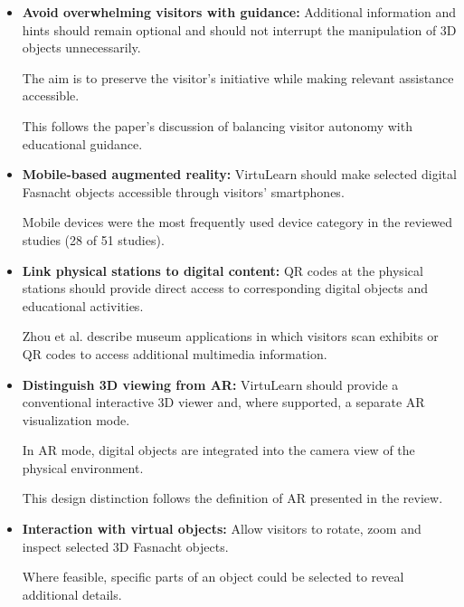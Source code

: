 \begin{itemize}
    This is a proposed application of visitor autonomy
    and structured learning support to VirtuLearn.
    \cite[pp.~708,~711,~733--734]{franse_families_2021}

    \item \textbf{Avoid overwhelming visitors with guidance:}
    Additional information and hints should remain
    optional and should not interrupt the manipulation
    of 3D objects unnecessarily.

    The aim is to preserve the visitor's initiative
    while making relevant assistance accessible.

    This follows the paper's discussion of balancing
    visitor autonomy with educational guidance.
    \cite[pp.~711--712,~733--734]{franse_families_2021}

    \item \textbf{Mobile-based augmented reality:}
    VirtuLearn should make selected digital Fasnacht
    objects accessible through visitors' smartphones.

    Mobile devices were the most frequently used
    device category in the reviewed studies
    (28 of 51 studies).
    \cite[pp.~9--10]{zhou_meta-analytic_2022}

    \item \textbf{Link physical stations to digital content:}
    QR codes at the physical stations should provide
    direct access to corresponding digital objects
    and educational activities.

    Zhou et al. describe museum applications in which
    visitors scan exhibits or QR codes to access
    additional multimedia information.
    \cite[p.~10]{zhou_meta-analytic_2022}

    \item \textbf{Distinguish 3D viewing from AR:}
    VirtuLearn should provide a conventional
    interactive 3D viewer and, where supported,
    a separate AR visualization mode.

    In AR mode, digital objects are integrated
    into the camera view of the physical environment.

    This design distinction follows the definition
    of AR presented in the review.
    \cite[p.~2]{zhou_meta-analytic_2022}

    \item \textbf{Interaction with virtual objects:}
    Allow visitors to rotate, zoom and inspect
    selected 3D Fasnacht objects.

    Where feasible, specific parts of an object
    could be selected to reveal additional details.


\end{itemize}
